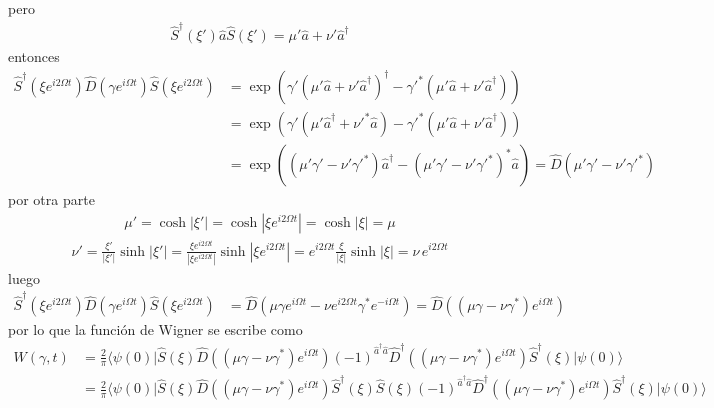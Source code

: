 pero
\begin{align*}
  \hat{S}^{\dagger}(\xi')\hat{a}\hat{S}(\xi') = \mu' \hat{a} + \nu' \hat{a}^{\dagger}
\end{align*}
entonces
\begin{align*}
  \hat{S}^{\dagger}\left(\xi e^{i2\Omega t}\right)\hat{D}\left(\gamma e^{i\Omega t}\right) \hat{S}(\xi e^{i 2\Omega t})
   & = \exp\left(\gamma' \left(\mu' \hat{a}+\nu'\hat{a}^{\dagger}\right)^{\dagger}-\gamma'^{*}\left(\mu' \hat{a}+\nu'\hat{a}^{\dagger}\right)\right) \\
   & = \exp\left(\gamma' \left(\mu' \hat{a}^{\dagger}+\nu'^{*}\hat{a}\right)-\gamma'^{*}\left(\mu' \hat{a}+\nu'\hat{a}^{\dagger}\right)\right)       \\
   & = \exp\left(\left(\mu'\gamma'-\nu'\gamma'^{*} \right)\hat{a}^{\dagger}-\left(\mu'\gamma'-\nu'\gamma'^{*} \right)^{*}\hat{a}\right)
  = \hat{D}\left(\mu'\gamma'-\nu'\gamma'^{*}\right)
\end{align*}
por otra parte
\begin{align*}
  \mu' = \cosh\vert\xi'\vert = \cosh\left\vert \xi e^{i 2\Omega t}\right\vert = \cosh\left\vert \xi\right\vert = \mu
\end{align*}
\begin{align*}
  \nu' = \frac{\xi'}{\vert\xi'\vert}\sinh\left\vert \xi'\right\vert = \frac{\xi e^{i2\Omega t}}{\left\vert\xi e^{i2\Omega t}\right\vert} \sinh\left\vert \xi e^{i2\Omega t} \right\vert = e^{i2\Omega t} \frac{\xi}{\left\vert\xi \right\vert} \sinh\left\vert \xi  \right\vert = \nu \, e^{i2\Omega t}
\end{align*}
luego
\begin{align*}
  \hat{S}^{\dagger}\left(\xi e^{i2\Omega t}\right)\hat{D}\left(\gamma e^{i\Omega t}\right) \hat{S}(\xi e^{i 2\Omega t})
   & = \hat{D}\left(\mu \gamma e^{i\Omega t} - \nu e^{i2\Omega t} \gamma^{*}e^{-i\Omega t}\right) = \hat{D}\left(\left(\mu\gamma - \nu\gamma^{*}\right)e^{i\Omega t}\right)
\end{align*}
por lo que la funci\'on de Wigner se escribe como
\begin{align*}
  W(\gamma,t) & = \frac{2}{\pi} \langle \psi(0)\vert \hat{S}(\xi)\hat{D}\left(\left(\mu\gamma-\nu\gamma^{*}\right)e^{i\Omega t}\right) (-1)^{\hat{a}^{\dagger}\hat{a}} \hat{D}^{\dagger}\left(\left(\mu\gamma-\nu\gamma^{*}\right)e^{i\Omega t}\right)\hat{S}^{\dagger}(\xi) \vert \psi(0)\rangle
  \\
              & = \frac{2}{\pi} \langle \psi(0)\vert \hat{S}(\xi)\hat{D}\left(\left(\mu\gamma-\nu\gamma^{*}\right)e^{i\Omega t}\right) \hat{S}^{\dagger}(\xi)\hat{S}(\xi)(-1)^{\hat{a}^{\dagger}\hat{a}} \hat{D}^{\dagger}\left(\left(\mu\gamma-\nu\gamma^{*}\right)e^{i\Omega t}\right)\hat{S}^{\dagger}(\xi) \vert \psi(0)\rangle
\end{align*}
